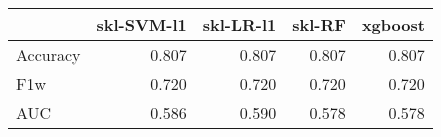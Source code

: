 \begin{tabular}{lrrrr}
\toprule
{} &  skl-SVM-l1 &  skl-LR-l1 &  skl-RF &  xgboost \\
\midrule
Accuracy &       0.807 &      0.807 &   0.807 &    0.807 \\
F1w      &       0.720 &      0.720 &   0.720 &    0.720 \\
AUC      &       0.586 &      0.590 &   0.578 &    0.578 \\
\bottomrule
\end{tabular}
